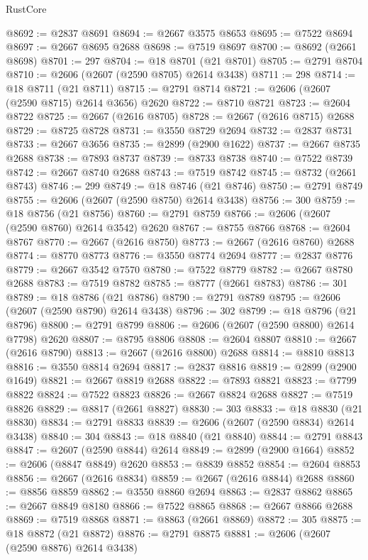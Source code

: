 \begin{lexlean}{RustCore}
\begin{coremodule}
@8692 := @2837 @8691
@8694 := @2667 @3575 @8653
@8695 := @7522 @8694
@8697 := @2667 @8695 @2688
@8698 := @7519 @8697
@8700 := @8692 (@2661 @8698)
@8701 := 297
@8704 := @18 @8701 (@21 @8701)
@8705 := @2791 @8704
@8710 := @2606 (@2607 (@2590 @8705) @2614 @3438)
@8711 := 298
@8714 := @18 @8711 (@21 @8711)
@8715 := @2791 @8714
@8721 := @2606 (@2607 (@2590 @8715) @2614 @3656) @2620
@8722 := @8710 @8721
@8723 := @2604 @8722
@8725 := @2667 (@2616 @8705)
@8728 := @2667 (@2616 @8715) @2688
@8729 := @8725 @8728
@8731 := @3550 @8729 @2694
@8732 := @2837 @8731
@8733 := @2667 @3656
@8735 := @2899 (@2900 @1622)
@8737 := @2667 @8735 @2688
@8738 := @7893 @8737
@8739 := @8733 @8738
@8740 := @7522 @8739
@8742 := @2667 @8740 @2688
@8743 := @7519 @8742
@8745 := @8732 (@2661 @8743)
@8746 := 299
@8749 := @18 @8746 (@21 @8746)
@8750 := @2791 @8749
@8755 := @2606 (@2607 (@2590 @8750) @2614 @3438)
@8756 := 300
@8759 := @18 @8756 (@21 @8756)
@8760 := @2791 @8759
@8766 := @2606 (@2607 (@2590 @8760) @2614 @3542) @2620
@8767 := @8755 @8766
@8768 := @2604 @8767
@8770 := @2667 (@2616 @8750)
@8773 := @2667 (@2616 @8760) @2688
@8774 := @8770 @8773
@8776 := @3550 @8774 @2694
@8777 := @2837 @8776
@8779 := @2667 @3542 @7570
@8780 := @7522 @8779
@8782 := @2667 @8780 @2688
@8783 := @7519 @8782
@8785 := @8777 (@2661 @8783)
@8786 := 301
@8789 := @18 @8786 (@21 @8786)
@8790 := @2791 @8789
@8795 := @2606 (@2607 (@2590 @8790) @2614 @3438)
@8796 := 302
@8799 := @18 @8796 (@21 @8796)
@8800 := @2791 @8799
@8806 := @2606 (@2607 (@2590 @8800) @2614 @7798) @2620
@8807 := @8795 @8806
@8808 := @2604 @8807
@8810 := @2667 (@2616 @8790)
@8813 := @2667 (@2616 @8800) @2688
@8814 := @8810 @8813
@8816 := @3550 @8814 @2694
@8817 := @2837 @8816
@8819 := @2899 (@2900 @1649)
@8821 := @2667 @8819 @2688
@8822 := @7893 @8821
@8823 := @7799 @8822
@8824 := @7522 @8823
@8826 := @2667 @8824 @2688
@8827 := @7519 @8826
@8829 := @8817 (@2661 @8827)
@8830 := 303
@8833 := @18 @8830 (@21 @8830)
@8834 := @2791 @8833
@8839 := @2606 (@2607 (@2590 @8834) @2614 @3438)
@8840 := 304
@8843 := @18 @8840 (@21 @8840)
@8844 := @2791 @8843
@8847 := @2607 (@2590 @8844) @2614
@8849 := @2899 (@2900 @1664)
@8852 := @2606 (@8847 @8849) @2620
@8853 := @8839 @8852
@8854 := @2604 @8853
@8856 := @2667 (@2616 @8834)
@8859 := @2667 (@2616 @8844) @2688
@8860 := @8856 @8859
@8862 := @3550 @8860 @2694
@8863 := @2837 @8862
@8865 := @2667 @8849 @8180
@8866 := @7522 @8865
@8868 := @2667 @8866 @2688
@8869 := @7519 @8868
@8871 := @8863 (@2661 @8869)
@8872 := 305
@8875 := @18 @8872 (@21 @8872)
@8876 := @2791 @8875
@8881 := @2606 (@2607 (@2590 @8876) @2614 @3438)

\end{coremodule}
\end{lexlean}
